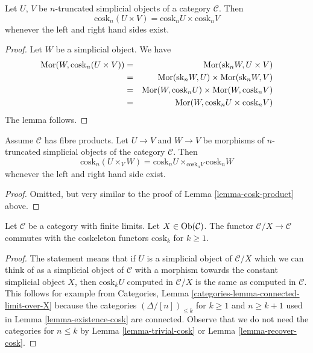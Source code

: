 \begin{lemma}
\label{lemma-cosk-product}
Let $U$, $V$ be $n$-truncated simplicial objects of a
category $\mathcal{C}$. Then
$$
\text{cosk}_n (U \times V) = \text{cosk}_nU \times \text{cosk}_nV
$$
whenever the left and right hand sides exist.
\end{lemma}

\begin{proof}
Let $W$ be a simplicial object. We have
\begin{eqnarray*}
\mathop{\mathrm{Mor}}\nolimits(W, \text{cosk}_n (U \times V))
& = &
\mathop{\mathrm{Mor}}\nolimits(\text{sk}_n W, U \times V) \\
& = &
\mathop{\mathrm{Mor}}\nolimits(\text{sk}_n W, U)
\times
\mathop{\mathrm{Mor}}\nolimits(\text{sk}_nW, V) \\
& = &
\mathop{\mathrm{Mor}}\nolimits(W, \text{cosk}_n U)
\times
\mathop{\mathrm{Mor}}\nolimits(W, \text{cosk}_n V) \\
& = &
\mathop{\mathrm{Mor}}\nolimits(W, \text{cosk}_n U \times \text{cosk}_n V)
\end{eqnarray*}
The lemma follows.
\end{proof}

\begin{lemma}
\label{lemma-cosk-fibre-product}
Assume $\mathcal{C}$ has fibre products.
Let $U \to V$ and $W \to V$ be morphisms
of $n$-truncated simplicial objects of the
category $\mathcal{C}$. Then
$$
\text{cosk}_n (U \times_V W)
=
\text{cosk}_nU \times_{\text{cosk}_n V} \text{cosk}_nW
$$
whenever the left and right hand side exist.
\end{lemma}

\begin{proof}
Omitted, but very similar to the proof of
Lemma \ref{lemma-cosk-product} above.
\end{proof}

\begin{lemma}
\label{lemma-cosk-above-object}
Let $\mathcal{C}$ be a category with finite limits.
Let $X \in \mathop{\mathrm{Ob}}\nolimits(\mathcal{C})$.
The functor $\mathcal{C}/X \to \mathcal{C}$ commutes with
the coskeleton functors $\text{cosk}_k$ for $k \geq 1$.
\end{lemma}

\begin{proof}
The statement means that if $U$ is a simplicial object of $\mathcal{C}/X$
which we can think of as a simplicial object of $\mathcal{C}$ with a morphism
towards the constant simplicial object $X$, then $\text{cosk}_k U$
computed in $\mathcal{C}/X$ is the same as computed in $\mathcal{C}$.
This follows for example from
Categories, Lemma \ref{categories-lemma-connected-limit-over-X}
because the categories $(\Delta/[n])_{\leq k}$ for $k \geq 1$ and
$n \geq k + 1$ used in Lemma \ref{lemma-existence-cosk}
are connected. Observe that we do not need the categories
for $n \leq k$ by Lemma \ref{lemma-trivial-cosk} or
Lemma \ref{lemma-recover-cosk}.
\end{proof}

